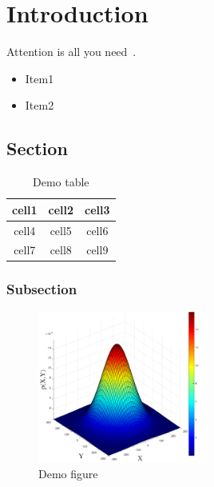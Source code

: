 
\chapter{Introduction}

Attention is all you need~\cite{vaswani2017attention}.

\begin{itemize}
    \item Item1
    \item Item2
\end{itemize}

\lipsum[1-2]

\section{Section}

\lipsum[1-2]

\begin{table}[htb]
    \centering
    \caption{Demo table}
    \begin{tabular}{c|c|c}
        cell1 & cell2 & cell3 \\ 
        \hline
        cell4 & cell5 & cell6 \\ 
        cell7 & cell8 & cell9
    \end{tabular}
\end{table}

\subsection{Subsection}

\lipsum[1-2]

\begin{figure}[htb]
\centering
\includegraphics[width=0.5\textwidth]{fig/demo}
\caption{Demo figure}
\end{figure}
